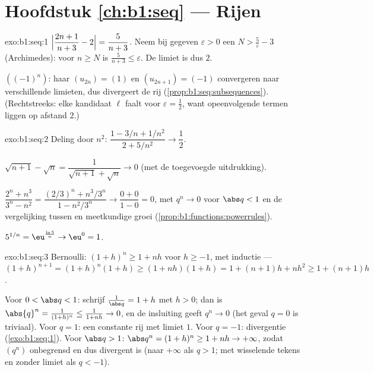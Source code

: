 \section*{Hoofdstuk \ref{ch:b1:seq} --- Rijen}

\begin{solution}{exo:b1:seq:1}
$\Bigl|\dfrac{2n+1}{n+3} - 2\Bigr| = \dfrac{5}{n+3}$. Neem bij gegeven
$\varepsilon > 0$ een $N > \frac 5\varepsilon - 3$ (Archimedes): voor $n
\geq N$ is $\frac{5}{n+3} \leq \varepsilon$. De limiet is dus $2$.

$((-1)^n)$: haar  $(u_{2n}) = (1)$ en $(u_{2n+1}) = (-1)$
convergeren naar verschillende limieten, dus divergeert de rij
(\cref{prop:b1:seq:subsequences}). (Rechtstreeks: elke kandidaat $\ell$
faalt voor $\varepsilon = \frac12$, want opeenvolgende termen liggen op
afstand $2$.)
\end{solution}

\begin{solution}{exo:b1:seq:2}
Deling door $n^2$: $\dfrac{1 - 3/n + 1/n^2}{2 + 5/n^2} \to \dfrac12$.

$\sqrt{n+1} - \sqrt n = \dfrac{1}{\sqrt{n+1} + \sqrt n} \to 0$ (met de
toegevoegde uitdrukking).

$\dfrac{2^n + n^3}{3^n - n^2} = \dfrac{(2/3)^n + n^3/3^n}{1 - n^2/3^n}
\to \dfrac{0 + 0}{1 - 0} = 0$, met $q^n \to 0$ voor $\abs q < 1$ en de
vergelijking tussen  en meetkundige groei
(\cref{prop:b1:functions:powerrules}).

$5^{1/n} = \eu^{\frac{\ln 5}{n}} \to \eu^0 = 1$.
\end{solution}

\begin{solution}{exo:b1:seq:3}
Bernoulli: $(1+h)^n \geq 1 + nh$ voor $h \geq -1$, met inductie ---
$(1+h)^{n+1} = (1+h)^n(1+h) \geq (1+nh)(1+h) = 1 + (n+1)h + nh^2 \geq 1 +
(n+1)h$.

Voor $0 < \abs q < 1$: schrijf $\frac{1}{\abs q} = 1 + h$ met $h > 0$;
dan is $\abs{q}^n = \frac{1}{(1+h)^n} \leq \frac{1}{1 + nh} \to 0$, en de
insluiting geeft $q^n \to 0$ (het geval $q = 0$ is triviaal). Voor $q =
1$: een constante rij met limiet $1$. Voor $q = -1$: divergentie
(\cref{exo:b1:seq:1}). Voor $\abs q > 1$: $\abs q^n = (1 + h)^n \geq 1 +
nh \to +\infty$, zodat $(q^n)$ onbegrensd en dus divergent is (naar
$+\infty$ als $q > 1$; met wisselende tekens en zonder limiet als $q <
-1$).
\end{solution}

